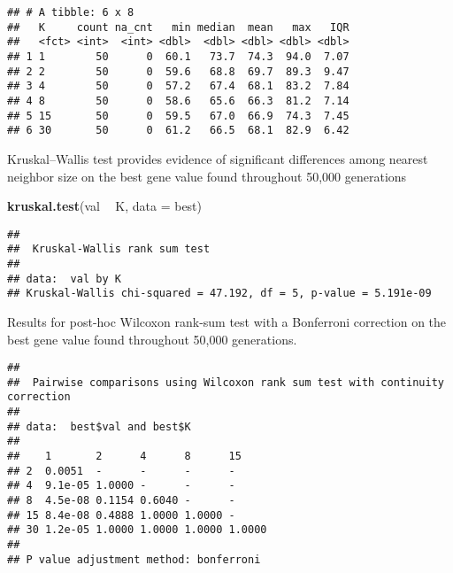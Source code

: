 \documentclass[]{book}
\newenvironment{Shaded}{\begin{snugshade}}{\end{snugshade}}
\newcommand{\DataTypeTok}[1]{\textcolor[rgb]{0.13,0.29,0.53}{#1}}
\newcommand{\KeywordTok}[1]{\textcolor[rgb]{0.13,0.29,0.53}{\textbf{#1}}}
\newcommand{\NormalTok}[1]{#1}
\newcommand{\OperatorTok}[1]{\textcolor[rgb]{0.81,0.36,0.00}{\textbf{#1}}}
\newcommand{\OtherTok}[1]{\textcolor[rgb]{0.56,0.35,0.01}{#1}}
\newcommand{\StringTok}[1]{\textcolor[rgb]{0.31,0.60,0.02}{#1}}
\begin{document}
\begin{verbatim}
## # A tibble: 6 x 8
##   K     count na_cnt   min median  mean   max   IQR
##   <fct> <int>  <int> <dbl>  <dbl> <dbl> <dbl> <dbl>
## 1 1        50      0  60.1   73.7  74.3  94.0  7.07
## 2 2        50      0  59.6   68.8  69.7  89.3  9.47
## 3 4        50      0  57.2   67.4  68.1  83.2  7.84
## 4 8        50      0  58.6   65.6  66.3  81.2  7.14
## 5 15       50      0  59.5   67.0  66.9  74.3  7.45
## 6 30       50      0  61.2   66.5  68.1  82.9  6.42
\end{verbatim}

Kruskal--Wallis test provides evidence of significant differences among nearest neighbor size on the best gene value found throughout 50,000 generations

\begin{Shaded}
\begin{Highlighting}[]
\KeywordTok{kruskal.test}\NormalTok{(val }\OperatorTok{~}\StringTok{ }\NormalTok{K, }\DataTypeTok{data =}\NormalTok{ best)}
\end{Highlighting}
\end{Shaded}

\begin{verbatim}
## 
##  Kruskal-Wallis rank sum test
## 
## data:  val by K
## Kruskal-Wallis chi-squared = 47.192, df = 5, p-value = 5.191e-09
\end{verbatim}

Results for post-hoc Wilcoxon rank-sum test with a Bonferroni correction on the best gene value found throughout 50,000 generations.

\begin{Shaded}
\end{Shaded}

\begin{verbatim}
## 
##  Pairwise comparisons using Wilcoxon rank sum test with continuity correction 
## 
## data:  best$val and best$K 
## 
##    1       2      4      8      15    
## 2  0.0051  -      -      -      -     
## 4  9.1e-05 1.0000 -      -      -     
## 8  4.5e-08 0.1154 0.6040 -      -     
## 15 8.4e-08 0.4888 1.0000 1.0000 -     
## 30 1.2e-05 1.0000 1.0000 1.0000 1.0000
## 
## P value adjustment method: bonferroni
\end{verbatim}
\end{document}

